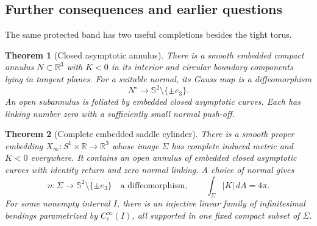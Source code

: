 \documentclass[11pt]{amsart}
\newtheorem{theorem}{Theorem}[section]
\theoremstyle{definition}
\theoremstyle{remark}
\newcommand{\R}{\mathbb R}\newcommand{\Sph}{\mathbb S}
\numberwithin{equation}{section}
\begin{document}
\subsection{Further consequences and earlier questions}
The same protected band has two useful completions besides the tight torus.
\begin{theorem}[Closed asymptotic annulus]\label{thm:main-annulus}
There is a smooth embedded compact annulus $N\subset\R^3$ with $K<0$
in its interior and circular boundary components lying in tangent planes.
For a suitable normal, its Gauss map is a diffeomorphism
\[
 N^\circ\longrightarrow\Sph^2\setminus\{\pm e_3\}.
\]
An open subannulus is foliated by embedded closed asymptotic curves.
Each has linking number zero with a sufficiently small normal push-off.
\end{theorem}

\begin{theorem}[Complete embedded saddle cylinder]\label{thm:complete-cylinder}
There is a smooth proper embedding $X_\infty:S^1\times\R\to\R^3$
whose image $\Sigma$ has complete induced metric and $K<0$ everywhere.
It contains an open annulus of embedded closed asymptotic curves with
identity return and zero normal linking. A choice of normal gives
\[
 n:\Sigma\longrightarrow\Sph^2\setminus\{\pm e_3\}
 \quad\text{a diffeomorphism},\qquad
 \int_\Sigma|K|\,dA=4\pi.
\]
For some nonempty interval $I$, there is an injective linear family of
infinitesimal bendings parametrized by $C_c^\infty(I)$, all supported in
one fixed compact subset of $\Sigma$.
\end{theorem}
\end{document}
